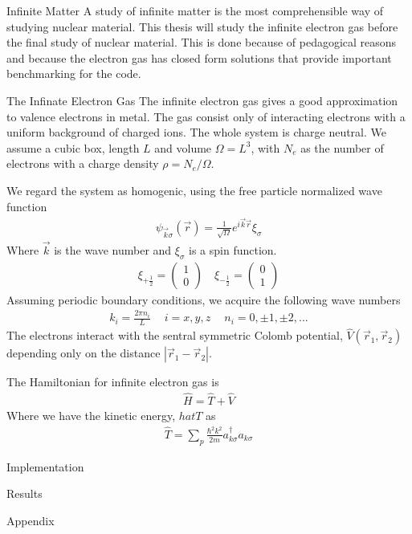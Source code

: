 \documentclass[twoside,english]{uiofysmaster}
\begin{document}
\begin{chapter}{Infinite Matter}
	A study of infinite matter is the most comprehensible way of studying nuclear material. This thesis will study the infinite electron gas before the final study of nuclear material. This is done because of pedagogical reasons and because the electron gas has closed form solutions that provide important benchmarking for the code. 
	\begin{section}{The Infinate Electron Gas}
		The infinite electron gas gives a good approximation to valence electrons in metal. The gas consist only of interacting electrons with a uniform background of charged ions. The whole system is charge neutral. We assume a cubic box, length $L$ and volume $\Omega = L^3$, with $N_e$ as the number of electrons with a charge density $\rho = N_e / \Omega$.

		We regard the system as homogenic, using the free particle normalized wave function
		\begin{align}
		 	\psi_{\vec k \sigma} (\vec r) = \frac{1}{\sqrt{\Omega}} e^{i \vec k \vec r} \xi_{\sigma}
		 \end{align}
		 Where $\vec k$ is the wave number and $\xi_{\sigma}$ is a spin function. 
		 \begin{align}
		 	\xi_{+\frac{1}{2}} = \left( \begin{matrix} 1 \\ 0 \end{matrix} \right) \:\;\:\; \xi_{-\frac{1}{2}} = \left( \begin{matrix} 0 \\ 1 \end{matrix} \right)
		 \end{align}
		 Assuming periodic boundary conditions, we acquire the following wave numbers
		 \begin{align}
		 	k_i = \frac{2\pi n_i}{L} \:\:\:\;\; i = x,y,z \;\;\:\:\: n_i = 0, \pm 1, \pm 2, ...
		 \end{align}
		 The electrons interact with the sentral symmetric Colomb potential, $\hat V(\vec r_1, \vec r_2)$ depending only on the distance $\left| \vec r_1 - \vec r_2 \right|$. 

		 The Hamiltonian for infinite electron gas is
		 \begin{align}
		 	\hat H = \hat T + \hat V
		 \end{align}
		 Where we have the kinetic energy, $hat T$ as
		 \begin{align}
		 	\hat T = \sum_p \frac{\hbar ^2 k^2}{2m} a_{k \sigma}^{\dagger} a_{k \sigma}
		 \end{align}


		 
	\end{section}
\end{chapter}




\begin{chapter}{Implementation}
	
\end{chapter}




\begin{chapter}{Results}
	
\end{chapter}




\begin{chapter}{Appendix}
	
\end{chapter}
\end{document}
